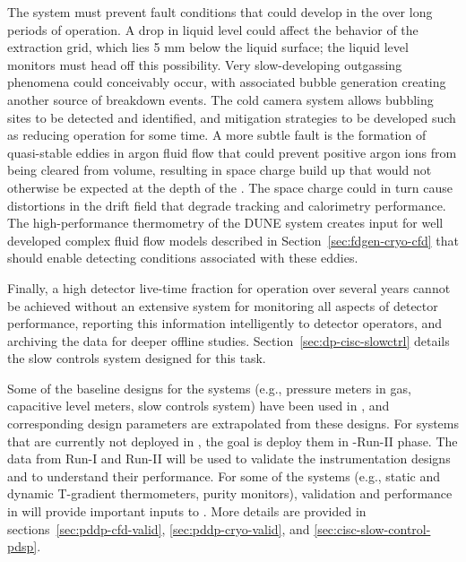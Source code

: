  
The  system must prevent fault conditions that could develop in the  over long periods of operation.
A drop in liquid level could affect the behavior of the extraction grid, which lies 5 mm below the liquid surface; the liquid level monitors must head off this possibility.  Very slow-developing outgassing phenomena could conceivably occur, with associated bubble generation creating another source of  breakdown events.
The cold camera system allows bubbling sites to be detected and identified, and mitigation strategies to be developed such as reducing  operation for some time.  A more subtle  fault is the formation of quasi-stable eddies in argon fluid flow that could prevent positive argon ions from being cleared from  volume, resulting in space charge build up that would not otherwise be expected at the depth of the .  The space charge could in turn cause distortions in the  drift field that degrade tracking and calorimetry performance.  The high-performance thermometry  of the DUNE  system creates input for well developed complex fluid flow models described in Section~\ref{sec:fdgen-cryo-cfd} that should enable detecting conditions associated with these eddies.
 
Finally, a high detector live-time fraction for operation over several years cannot be achieved without an extensive system for monitoring all aspects of detector performance, reporting this information intelligently to detector operators, and archiving the data for deeper offline studies.  Section~\ref{sec:dp-cisc-slowctrl} details the  slow controls system designed for this task.

Some of the baseline designs for the  systems (e.g., pressure meters in gas, capacitive level meters, slow controls system) have been used in , %
and corresponding design parameters are extrapolated from these designs. For systems that are currently not deployed in , the goal is deploy them in -Run-II phase. The  data from Run-I and Run-II will be used to validate the instrumentation designs and to understand their performance. For some of the  systems (e.g., static and dynamic T-gradient thermometers, purity monitors), validation and performance in  will provide important inputs to  . More details are provided in sections~\ref{sec:pddp-cfd-valid}, \ref{sec:pddp-cryo-valid}, and \ref{sec:cisc-slow-control-pdsp}.


